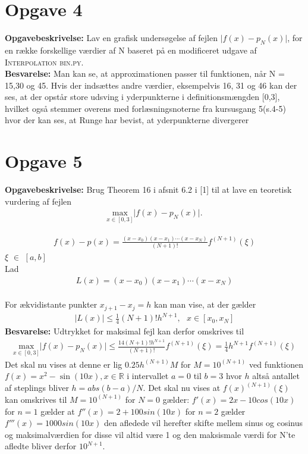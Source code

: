 \section*{Opgave 4}
\textbf{Opgavebeskrivelse:} Lav en grafisk undersøgelse af fejlen $\lvert f(x)-p_N(x) \rvert$, for en række forskellige værdier af N baseret på en modificeret udgave af \textsc{Interpolation bin.py.}
\\
\textbf{Besvarelse:} Man kan se, at approximationen passer til funktionen, når N = 15,30 og 45. Hvis der indsættes andre værdier, eksempelvis 16, 31 og 46 kan der ses, at der opstår store udsving i yderpunkterne i definitionsmængden [0,3], hvilket også stemmer overens med forlæsningsnoterne fra kursusgang 5(s.4-5) hvor der kan ses, at Runge har bevist, at yderpunkterne divergerer
\section*{Opgave 5}
\textbf{Opgavebeskrivelse:} Brug Theorem 16 i afsnit 6.2 i [1] til at lave en teoretisk vurdering af fejlen
\begin{align*}
\underset{x \in \left [0,3 \right ]}{\text{max}} \lvert f(x)-p_N(x) \rvert.
\end{align*}

\begin{align*}
f(x)-p(x) = \frac{(x-x_0)(x-x_1)\cdots(x-x_N)}{(N+1)!}f^{(N+1)}(\xi)
\end{align*}
 $\xi$ $\in$ $\left [a,b \right ]$
\\
Lad
\begin{align*}
L(x)=(x-x_0)(x-x_1)\cdots(x-x_N)
\end{align*}
\\
For ækvidistante punkter $x_{j+1} - x_j = h$ kan man vise, at der gælder
\begin{align*}
\lvert L(x) \rvert \leq \frac{1}{4}(N+1)!h^{N+1}, \text{   } x \in \left [x_0, x_N \right ] 
\end{align*}
\textbf{Besvarelse:} 
Udtrykket for maksimal fejl kan derfor omskrives til
\begin{align*}
\underset{x \in \left [0,3 \right ]}{\text{max}} \lvert f(x)-p_N(x) \rvert \leq \frac{{1}{4}(N+1)!h^{N+1}}{(N+1)!}f^{(N+1)}(\xi)=\frac{1}{4}h^{N+1}f^{(N+1)}(\xi)
\end{align*}
Det skal nu vises at denne er lig  $0.25h^{(N+1)}M$ for $M=10^{(N+1)}$ ved funktionen $f(x)=x^2-\sin(10x), x \in \mathbb{R}$ i intervallet $a=0$ til $b=3$ hvor $h$ altså antallet af steplings bliver $h=abs(b-a)/N$. Det skal nu vises at $f(x)^{(N+1)}(\xi)$ kan omskrives til $M=10^{(N+1)}$
for $N=0$ gælder: $f'(x)=2x-10cos(10x)$ for $n=1$ gælder at $f''(x)=2+100sin(10x)$ for $n=2$ gælder $f'''(x)=1000sin(10x)$ den afledede vil herefter skifte mellem sinus og cosinus og maksimalværdien for disse vil altid være 1 og den maksismale værdi for N'te afledte bliver derfor $10^{N+1}$.
\\
